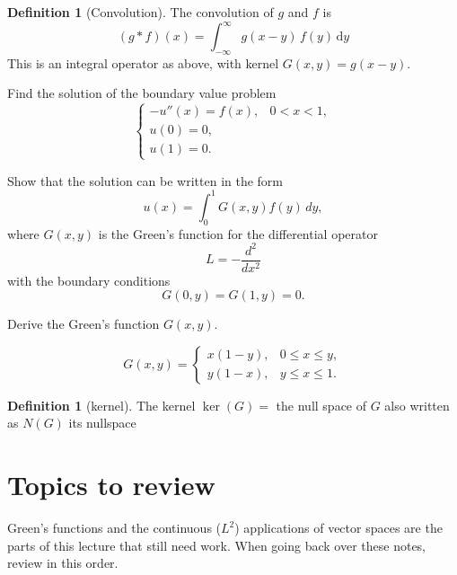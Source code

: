 \documentclass[11pt]{article}
\newcommand{\1}{\mathbf{1}}
\newcommand{\dd}{\,\mathrm{d}}
\theoremstyle{notestyle}
\theoremstyle{definition}
\newtheorem{definition}[theorem]{Definition}
\begin{document}
\begin{definition}[Convolution]
\label{def:convolution}
The convolution of $g$ and $f$ is
$$(g * f)(x) = \int_{-\infty}^{\infty} g(x - y)\, f(y)\dd y$$
This is an integral operator as above, with kernel $G(x, y) = g(x - y)$.
\end{definition}
Find the solution of the boundary value problem
\[
\begin{cases}
-u''(x)=f(x), & 0<x<1,\\
u(0)=0,\\
u(1)=0.
\end{cases}
\]

Show that the solution can be written in the form
\[
u(x)=\int_0^1 G(x,y)f(y)\,dy,
\]
where $G(x,y)$ is the Green's function for the differential operator
\[
L=-\frac{d^2}{dx^2}
\]
with the boundary conditions
\[
G(0,y)=G(1,y)=0.
\]

Derive the Green's function $G(x,y)$.
\begin{center}
\end{center}

\[
G(x,y)
=
\begin{cases}
x(1-y), & 0\leq x\leq y,\\[4pt]
y(1-x), & y\leq x\leq 1.
\end{cases}
\]
\begin{definition}[kernel]
\label{def:label} 
The kernel $\ker(G) = $ the null space of $G$ also written as $N(G)$ its nullspace 
\end{definition}

\section{Topics to review}
\label{sec:review-topics}
Green's functions and the continuous ($L^2$) applications of vector spaces are the
parts of this lecture that still need work. When going back over these notes,
review in this order.
\end{document}
